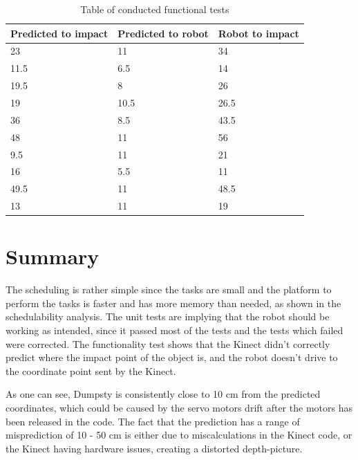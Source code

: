 \begin{table}[H]
	\begin{center}
		\begin{tabular}{ | p{5cm} | p{5cm} | p{5cm} |}
			\hline
			\textbf{Predicted to impact} & \textbf{Predicted to robot} & \textbf{Robot to impact} \\ \hline
			23 & 11 & 34 \\ \hline
			11.5 & 6.5 & 14 \\ \hline
			19.5 & 8 & 26 \\ \hline
			19 & 10.5 & 26.5 \\ \hline
			36 & 8.5 & 43.5 \\ \hline
			48 & 11 & 56 \\ \hline
			9.5 & 11 & 21 \\ \hline
			16 & 5.5 & 11 \\ \hline
			49.5 & 11 & 48.5 \\ \hline
			13 & 11 & 19 \\ \hline
			
		\end{tabular}
		\caption{Table of conducted functional tests}
		\label{table:FuncTest}
	\end{center}
\end{table}

\section{Summary}
\label{sec:summary}
The scheduling is rather simple since the tasks are small and the platform to perform the tasks is faster and has more memory than needed, as shown in the schedulability analysis. The unit tests are implying that the robot should be working as intended, since it passed most of the tests and the tests which failed were corrected. The functionality test shows that the Kinect didn’t correctly predict where the impact point of the object is, and the robot doesn’t drive to the coordinate point sent by the Kinect. 

As one can see, Dumpsty is consistently close to 10 cm from the predicted coordinates, which could be caused by the servo motors drift after the motors has been released in the code. The fact that the prediction has a range of misprediction of 10 - 50 cm is either due to miscalculations in the Kinect code, or the Kinect having hardware issues, creating a distorted depth-picture.

